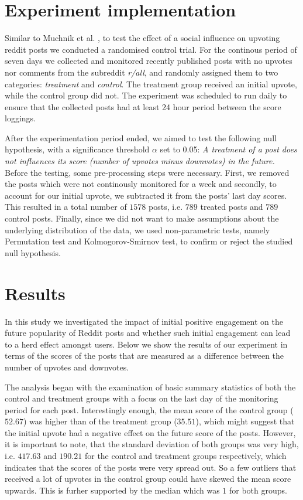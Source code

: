\documentclass[fleqn,12pt]{article}
\begin{document}
\section{Experiment implementation}
Similar to Muchnik et al. \cite{muchnik}, to test the effect of a social
influence on upvoting reddit posts we conducted a randomised control trial.
For the continous period of seven days we collected and monitored recently published posts with no upvotes 
nor comments from the subreddit \textit{r/all}, and randomly assigned them 
to two categories: \textit{treatment} and \textit{control}.
The treatment group received an initial upvote, while the control group did not. 
The experiment was scheduled to run daily to ensure that the collected posts
had at least 24 hour period between the score loggings.

After the experimentation period ended, we aimed to test the following null hypothesis, with a significance
threshold $\alpha$ set to 0.05:
\textit{A treatment of a post does not influences its score (number of upvotes minus downvotes) in the future.}
Before the testing, some pre-processing steps were necessary. 
First, we removed the posts which were not continously monitored for a week and secondly,
to account for our initial upvote, we subtracted it from the posts' last day scores.
This resulted in a total number of $1578$ posts, i.e. $789$ treated posts and $789$ control posts. 
Finally, since we did not want to make assumptions about the underlying 
distribution of the data, we used non-parametric tests, namely Permutation test and Kolmogorov-Smirnov test, to
confirm or reject the studied null hypothesis.

\section{Results}
In this study we investigated the impact of initial positive
engagement on the future popularity of Reddit posts and whether 
such initial engagement can lead to a herd effect amongst users. 
Below we show the results of our experiment in terms of the scores of the posts
that are measured as a difference between the number of upvotes and downvotes.

The analysis began with the examination of basic summary statistics
of both the control and treatment groups with a focus
on the last day of the monitoring period for each post. Interestingly enough,
the mean score of the control group ($52.67$) was higher than of the treatment group ($35.51$),
which might suggest that the initial upvote had a negative effect on the future score of the posts.
However, it is important to note, that the standard deviation of both groups was very high, 
i.e. $417.63$ and $190.21$ for the control and treatment groups respectively, which indicates
that the scores of the posts were very spread out. So a few outliers that received a lot of upvotes
in the control group could have skewed the mean score upwards. This is furher supported by the median
which was $1$ for both groups.
\end{document}
